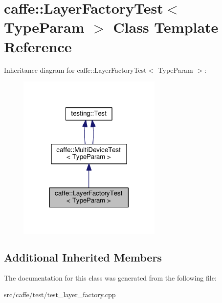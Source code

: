 \hypertarget{classcaffe_1_1_layer_factory_test}{}\section{caffe\+:\+:Layer\+Factory\+Test$<$ Type\+Param $>$ Class Template Reference}
\label{classcaffe_1_1_layer_factory_test}


Inheritance diagram for caffe\+:\+:Layer\+Factory\+Test$<$ Type\+Param $>$\+:
\nopagebreak
\begin{figure}[H]
\begin{center}
\leavevmode
\includegraphics[width=201pt]{classcaffe_1_1_layer_factory_test__inherit__graph}
\end{center}
\end{figure}
\subsection*{Additional Inherited Members}


The documentation for this class was generated from the following file\+:\begin{DoxyCompactItemize}
\item 
src/caffe/test/test\+\_\+layer\+\_\+factory.\+cpp\end{DoxyCompactItemize}
